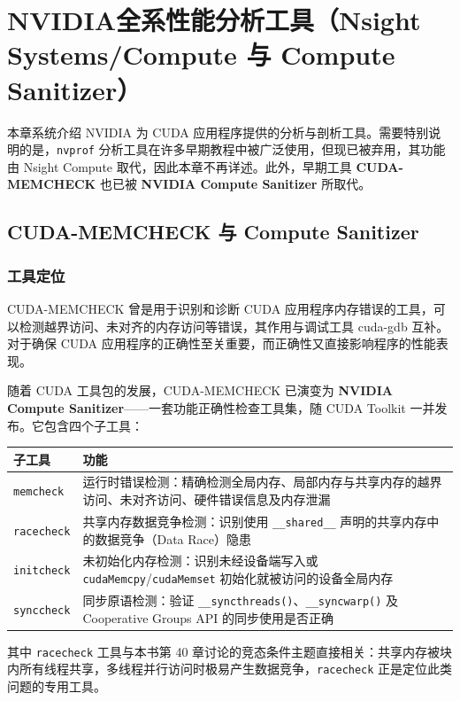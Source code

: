 \section{NVIDIA全系性能分析工具（Nsight Systems/Compute 与 Compute Sanitizer）}

本章系统介绍 NVIDIA 为 CUDA 应用程序提供的分析与剖析工具。需要特别说明的是，\texttt{nvprof} 分析工具在许多早期教程中被广泛使用，但现已被弃用，其功能由 Nsight Compute 取代，因此本章不再详述。此外，早期工具 \textbf{CUDA-MEMCHECK} 也已被 \textbf{NVIDIA Compute Sanitizer} 所取代。

\subsection{CUDA-MEMCHECK 与 Compute Sanitizer}

\subsubsection{工具定位}

CUDA-MEMCHECK 曾是用于识别和诊断 CUDA 应用程序内存错误的工具，可以检测越界访问、未对齐的内存访问等错误，其作用与调试工具 cuda-gdb 互补。对于确保 CUDA 应用程序的正确性至关重要，而正确性又直接影响程序的性能表现。

随着 CUDA 工具包的发展，CUDA-MEMCHECK 已演变为 \textbf{NVIDIA Compute Sanitizer}——一套功能正确性检查工具集，随 CUDA Toolkit 一并发布。它包含四个子工具：

\begin{center}
\begin{tabular}{|l|p{10.5cm}|}
\hline
\textbf{子工具} & \textbf{功能} \\
\hline
\texttt{memcheck} & 运行时错误检测：精确检测全局内存、局部内存与共享内存的越界访问、未对齐访问、硬件错误信息及内存泄漏 \\
\hline
\texttt{racecheck} & 共享内存数据竞争检测：识别使用 \texttt{\_\_shared\_\_} 声明的共享内存中的数据竞争（Data Race）隐患 \\
\hline
\texttt{initcheck} & 未初始化内存检测：识别未经设备端写入或 \texttt{cudaMemcpy}/\texttt{cudaMemset} 初始化就被访问的设备全局内存 \\
\hline
\texttt{synccheck} & 同步原语检测：验证 \texttt{\_\_syncthreads()}、\texttt{\_\_syncwarp()} 及 Cooperative Groups API 的同步使用是否正确 \\
\hline
\end{tabular}
\end{center}

其中 \texttt{racecheck} 工具与本书第 40 章讨论的竞态条件主题直接相关：共享内存被块内所有线程共享，多线程并行访问时极易产生数据竞争，\texttt{racecheck} 正是定位此类问题的专用工具。

